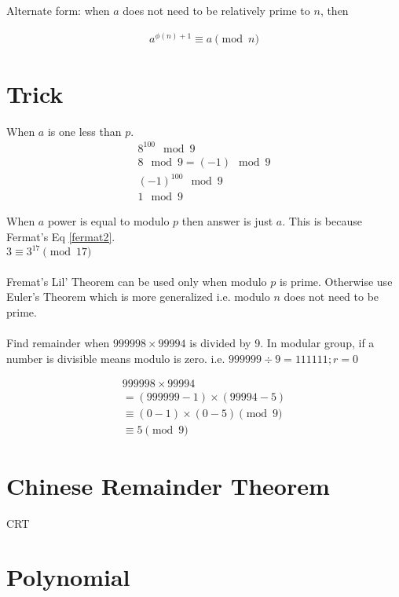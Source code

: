 \documentclass[a4paper]{article}
\begin{document}
Alternate form: when $a$ does not need to be relatively prime to $n$, then

\begin{align}
a^{\phi{(n)+1}} \equiv a \pmod{n}
\end{align}


\section{Trick}

When $a$ is one less than $p$.
\begin{align*}
8^{100} \mod 9 \\
8 \mod 9 = (-1) \mod 9 \\
(-1)^{100} \mod 9 \\
1 \mod 9
\end{align*}

When $a$ power is equal to modulo $p$ then answer is just $a$. This is because Fermat's Eq \eqref{fermat2}.
\\
$3 \equiv 3^{17} \pmod{17}$
\\
\\
Fremat's Lil' Theorem can be used only when modulo $p$ is prime. Otherwise use Euler's Theorem which is more generalized i.e. modulo $n$ does not need to be prime.
\\
\\
Find remainder when $999998 \times 99994$ is divided by 9. In modular group, if a number is divisible means modulo is zero. i.e. $999999 \div 9 = 111111; r = 0$

\begin{align*}
999998 \times 99994 \\
= (999999 - 1) \times (99994 - 5) \\
\equiv (0 - 1) \times (0 - 5) \pmod{9} \\
\equiv 5 \pmod{9}
\end{align*}


\section{Chinese Remainder Theorem}

CRT

\newpage

\section{Polynomial}
\end{document}
